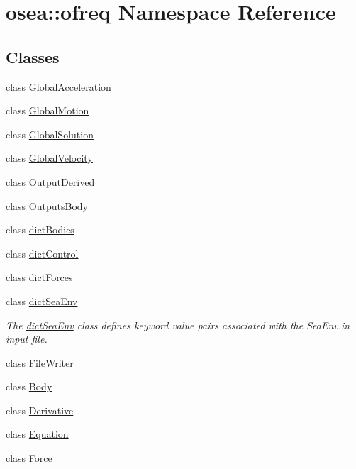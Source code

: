 \hypertarget{namespaceosea_1_1ofreq}{\section{osea\-:\-:ofreq Namespace Reference}
\label{namespaceosea_1_1ofreq}
}
\subsection*{Classes}
\begin{DoxyCompactItemize}
\item 
class \hyperlink{classosea_1_1ofreq_1_1_global_acceleration}{Global\-Acceleration}
\item 
class \hyperlink{classosea_1_1ofreq_1_1_global_motion}{Global\-Motion}
\item 
class \hyperlink{classosea_1_1ofreq_1_1_global_solution}{Global\-Solution}
\item 
class \hyperlink{classosea_1_1ofreq_1_1_global_velocity}{Global\-Velocity}
\item 
class \hyperlink{classosea_1_1ofreq_1_1_output_derived}{Output\-Derived}
\item 
class \hyperlink{classosea_1_1ofreq_1_1_outputs_body}{Outputs\-Body}
\item 
class \hyperlink{classosea_1_1ofreq_1_1dict_bodies}{dict\-Bodies}
\item 
class \hyperlink{classosea_1_1ofreq_1_1dict_control}{dict\-Control}
\item 
class \hyperlink{classosea_1_1ofreq_1_1dict_forces}{dict\-Forces}
\item 
class \hyperlink{classosea_1_1ofreq_1_1dict_sea_env}{dict\-Sea\-Env}
\begin{DoxyCompactList}\small\item\em The \hyperlink{classosea_1_1ofreq_1_1dict_sea_env}{dict\-Sea\-Env} class defines keyword value pairs associated with the Sea\-Env.\-in input file. \end{DoxyCompactList}\item 
class \hyperlink{classosea_1_1ofreq_1_1_file_writer}{File\-Writer}
\item 
class \hyperlink{classosea_1_1ofreq_1_1_body}{Body}
\item 
class \hyperlink{classosea_1_1ofreq_1_1_derivative}{Derivative}
\item 
class \hyperlink{classosea_1_1ofreq_1_1_equation}{Equation}
\item 
class \hyperlink{classosea_1_1ofreq_1_1_force}{Force}

\end{DoxyCompactItemize}
